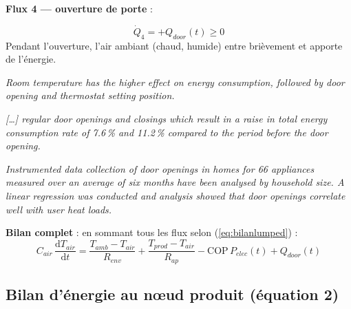 \documentclass[11pt,a4paper]{article}
\begin{document}
\begin{demo}
\medskip
\textbf{Flux 4 — ouverture de porte} :

$$\dot Q_4 = +Q_{door}(t) \ge 0$$
Pendant l'ouverture, l'air ambiant (chaud, humide) entre brièvement et apporte de l'énergie.

\begin{tcolorbox}[breakable,enhanced jigsaw,colback=yellow!10,colframe=yellow!50!black,boxrule=0.4pt,arc=2pt,
title=\textbf{Extrait textuel — Saidur et~al.\ (2002) \ref{saidur2002}, Conclusions p.~853}]
\og{} \emph{Room temperature has the higher effect on energy consumption, followed by
door opening and thermostat setting position.} \fg{}
\end{tcolorbox}

\begin{tcolorbox}[breakable,enhanced jigsaw,colback=yellow!10,colframe=yellow!50!black,boxrule=0.4pt,arc=2pt,
title=\textbf{Extrait textuel — Ipek-Dincer (2024) \ref{ipek2024}, Abstract}]
\og{} \emph{[\dots] regular door openings and closings which result in a raise in total
energy consumption rate of 7.6\,\% and 11.2\,\% compared to the period before the door
opening.} \fg{}
\end{tcolorbox}

\begin{tcolorbox}[breakable,enhanced jigsaw,colback=yellow!10,colframe=yellow!50!black,boxrule=0.4pt,arc=2pt,
title=\textbf{Extrait textuel — Harrington et~al.\ (2019) \ref{harrington2019}, Abstract}]
\og{} \emph{Instrumented data collection of door openings in homes for 66 appliances
measured over an average of six months have been analysed by household size. A linear
regression was conducted and analysis showed that door openings correlate well with user
heat loads.} \fg{}
\end{tcolorbox}

\medskip
\textbf{Bilan complet} : en sommant tous les flux selon (\ref{eq:bilanlumped}) :
\begin{equation}
\boxed{\;C_{air}\,\frac{\mathrm{d}T_{air}}{\mathrm{d}t}
= \frac{T_{amb}-T_{air}}{R_{env}}
+ \frac{T_{prod}-T_{air}}{R_{ap}}
- \mathrm{COP}\,P_{elec}(t)
+ Q_{door}(t)\;}
\label{eq:eq1}
\end{equation}
\end{demo}

\subsection{Bilan d'énergie au nœud produit (équation 2)}
\end{document}
